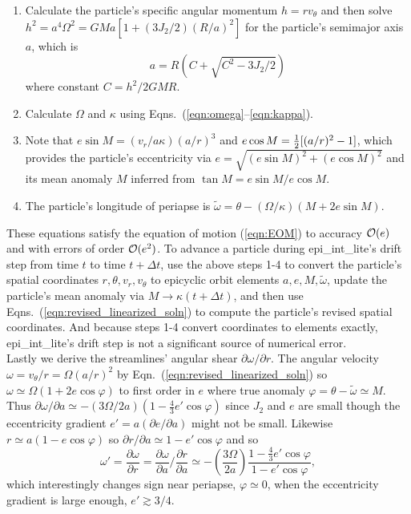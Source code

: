 \documentclass[preprint]{aastex62}
\begin{document}
\begin{enumerate}

\item Calculate the particle's specific angular momentum $h=r v_\theta$ and then solve 
$h^2 = a^4\Omega^2 = GMa[1 + (3J_2/2)(R/a)^2]$
for the particle's semimajor axis $a$, which is
\begin{equation}
    \label{eqn:a}
    a = R\left(C + \sqrt{C^2 - 3J_2/2}\right)
\end{equation}
where constant $C=h^2/2GMR$.

\item Calculate $\Omega$ and $\kappa$ using Eqns.\ (\ref{eqn:omega}--\ref{eqn:kappa}).

\item Note that $e\sin M = (v_r/a\kappa)(a/r)^3$ and $e\cos M = \mbox{$\frac{1}{2}$}[(a/r)^2 - 1]$, which 
provides the particle's eccentricity via $e = \sqrt{(e\sin M)^2 + (e\cos M)^2}$
and its mean anomaly $M$ inferred from $\tan M = e\sin M/e\cos M$.

\item The particle's longitude of periapse is 
$\tilde{\omega} = \theta - (\Omega/\kappa)(M + 2e\sin M)$.

\end{enumerate}
These equations satisfy the equation of motion (\ref{eqn:EOM}) to accuracy ${\cal O}(e)$ and
with errors of order ${\cal O}(e^2)$. To advance a particle during epi\_int\_lite's drift step from 
time $t$ to time $t + \Delta t$, use the above steps 1-4 to convert the particle's spatial
coordinates $r, \theta, v_r, v_\theta$ to epicyclic orbit elements $a,e,M,\tilde{\omega}$,
update the particle's mean anomaly via $M\rightarrow\kappa(t + \Delta t)$, and then use
Eqns.\ (\ref{eqn:revised_linearized_soln}) to compute the particle's revised spatial coordinates.
And because steps 1-4 convert coordinates to elements exactly, epi\_int\_lite's drift step 
is not a significant source of numerical error.\\

Lastly we derive the streamlines' angular shear $\partial\omega/\partial r$.
The angular velocity $\omega=v_\theta/r=\Omega(a/r)^2$ by Eqn.\ (\ref{eqn:revised_linearized_soln}) so
$\omega \simeq\Omega(1+2e\cos\varphi)$
to first order in $e$ where true anomaly $\varphi=\theta -\tilde{\omega}\simeq M$.
Thus $\partial\omega/\partial a \simeq -(3\Omega/2a)(1-\frac{4}{3}e'\cos\varphi)$
since $J_2$ and $e$ are small though
the eccentricity gradient $e'=a(\partial e/\partial a)$ might not be small. Likewise
$r\simeq a(1-e\cos\varphi)$ so $\partial r/\partial a\simeq 1-e'\cos\varphi$ and so
\begin{equation}
    \label{eqn:domega-dr}
    \omega' = \frac{\partial\omega}{\partial r} = 
        \frac{\partial\omega}{\partial a}/\frac{\partial r}{\partial a}
        \simeq -\left(\frac{3\Omega}{2a}\right) \frac{1-\frac{4}{3}e'\cos \varphi}{1-e'\cos \varphi},
\end{equation}
which interestingly changes sign near periapse, $\varphi\simeq0$, when the eccentricity gradient is large enough, 
$e'\gtrsim3/4$.
\end{document}
